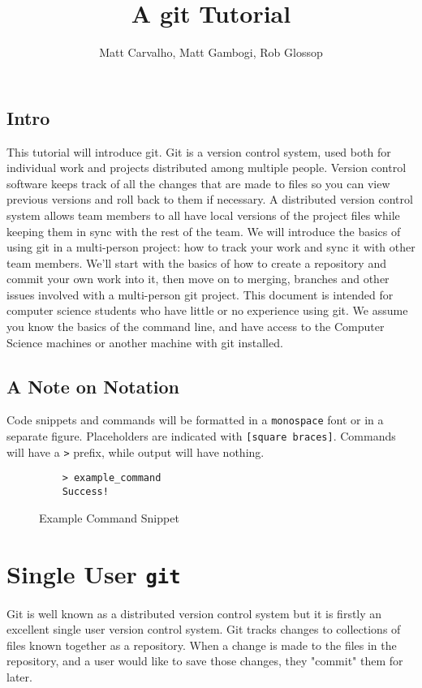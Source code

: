 \documentclass[11pt]{report}
\title{A git Tutorial}
\author{Matt Carvalho, Matt Gambogi, Rob Glossop}
\begin{document}
\thispagestyle{empty}
\maketitle

\clearpage {} 

\tableofcontents

\listoffigures

\clearpage {}
\section{Intro}
This tutorial will introduce git.  Git is a version control system,
used both for individual work and projects distributed among multiple
people.  Version control software keeps track of all the changes that
are made to files so you can view previous versions and roll back to
them if necessary.  A distributed version control system allows team
members to all have local versions of the project files while keeping
them in sync with the rest of the team. We will introduce the basics
of using git in a multi-person project: how to track your work and
sync it with other team members. We'll start with the basics of how to
create a repository and commit your own work into it, then move on to
merging, branches and other issues involved with a multi-person git
project. This document is intended for computer science students who
have little or no experience using git. We assume you know the basics
of the command line, and have access to the Computer Science machines
or another machine with git installed.

\section{A Note on Notation}
Code snippets and commands will be formatted in a \texttt{monospace} font or in
a separate figure. Placeholders are indicated with \texttt{[square
    braces]}. Commands will have a \texttt{>} prefix, while output
will have nothing.
\begin{figure}[h]
  \caption{Example Command Snippet}
  \begin{lstlisting}
    > example_command
    Success!
  \end{lstlisting}
\end{figure}

\chapter{Single User \texttt{git}}
Git is well known as a distributed version control system but it is
firstly an excellent single user version control system. 
Git tracks changes to collections of files known together as a repository.
When a change is made to the files in the repository, and a user would like
to save those changes, they "commit" them for later.
\end{document}
